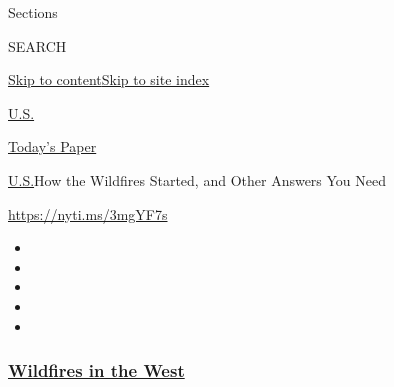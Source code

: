 Sections

SEARCH

\protect\hyperlink{site-content}{Skip to
content}\protect\hyperlink{site-index}{Skip to site index}

\href{https://www.nytimes3xbfgragh.onion/section/us}{U.S.}

\href{https://myaccount.nytimes3xbfgragh.onion/auth/login?response_type=cookie\&client_id=vi}{}

\href{https://www.nytimes3xbfgragh.onion/section/todayspaper}{Today's
Paper}

\href{/section/us}{U.S.}\textbar{}How the Wildfires Started, and Other
Answers You Need

\url{https://nyti.ms/3mgYF7s}

\begin{itemize}
\item
\item
\item
\item
\item
\end{itemize}

\hypertarget{wildfires-in-the-west}{%
\subsubsection{\texorpdfstring{\href{https://www.nytimes3xbfgragh.onion/spotlight/california-wildfires?name=styln-california-wildfires\&region=TOP_BANNER\&block=storyline_menu_recirc\&action=click\&pgtype=Article\&impression_id=9e615840-f52b-11ea-8531-a121d852b25e\&variant=undefined}{Wildfires
in the West}}{Wildfires in the West}}\label{wildfires-in-the-west}}

